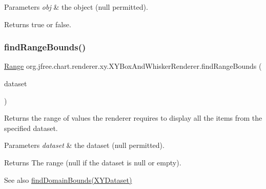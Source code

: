 \begin{DoxyParams}{Parameters}
{\em obj} & the object ({\ttfamily null} permitted).\\
\hline
\end{DoxyParams}
\begin{DoxyReturn}{Returns}
{\ttfamily true} or {\ttfamily false}. 
\end{DoxyReturn}
\mbox{\label{classorg_1_1jfree_1_1chart_1_1renderer_1_1xy_1_1_x_y_box_and_whisker_renderer_adc96bda51bf22ebb4fd9f6666be31f4d}} 
\subsubsection{\texorpdfstring{find\+Range\+Bounds()}{findRangeBounds()}}
{\footnotesize\ttfamily \mbox{\hyperlink{classorg_1_1jfree_1_1data_1_1_range}{Range}} org.\+jfree.\+chart.\+renderer.\+xy.\+X\+Y\+Box\+And\+Whisker\+Renderer.\+find\+Range\+Bounds (\begin{DoxyParamCaption}\item[{\mbox{\hyperlink{interfaceorg_1_1jfree_1_1data_1_1xy_1_1_x_y_dataset}{X\+Y\+Dataset}}}]{dataset }\end{DoxyParamCaption})}

Returns the range of values the renderer requires to display all the items from the specified dataset.


\begin{DoxyParams}{Parameters}
{\em dataset} & the dataset ({\ttfamily null} permitted).\\
\hline
\end{DoxyParams}
\begin{DoxyReturn}{Returns}
The range ({\ttfamily null} if the dataset is {\ttfamily null} or empty).
\end{DoxyReturn}
\begin{DoxySeeAlso}{See also}
\mbox{\hyperlink{classorg_1_1jfree_1_1chart_1_1renderer_1_1xy_1_1_abstract_x_y_item_renderer_aa663388be3250653a6883e5c1fb4da7e}{find\+Domain\+Bounds(\+X\+Y\+Dataset)}} 
\end{DoxySeeAlso}


